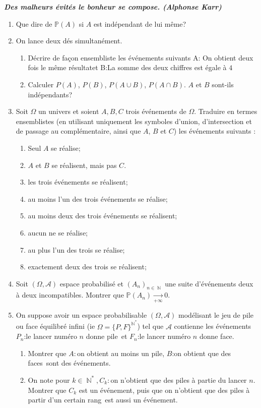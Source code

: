 \documentclass[12pt,a4paper]{article}
\DeclareMathOperator{\N}{\mathbb{N}}
\newcommand{\tribu}{\mathcal{A}}
\renewcommand{\Pr}{\mathbb{P}}
\begin{document}
\emph{\textbf{
Des malheurs évités le bonheur se compose.
(Alphonse Karr)
}}

\begin{enumerate}
\item
Que dire de $\mathbb{P}(A)$ si $A$ est indépendant de lui même?
\item On lance deux d\'es simultan\'ement. 
\begin{enumerate}
\item D\'ecrire 
de fa\c{c}on ensembliste les év\'enements suivants A:\og 
On obtient deux fois le m\^eme r\'esultat\fg et B:\og La 
somme des deux chiffres est \'egale \`a $4$ \fg
\item Calculer $P(A)$, $P(B)$, $P(A\cup B)$, $P(A\cap B)$. 
$A$ et $B$ sont-ils ind\'ependants?
\end{enumerate}

\item
Soit $\Omega$ un univers et soient $A,B,C$ trois événements de $\Omega$. Traduire en termes ensemblistes
(en utilisant uniquement les symboles d'union, d'intersection et de passage au complémentaire, ainsi que $A$, $B$ 
et $C$) les événements suivants :
\begin{enumerate}
	\item
	Seul $A$ se réalise;
	\item $A$ et $B$ se réalisent, mais pas $C$.
	\item  les trois événements se réalisent;
	\item au moins l'un des trois événements se réalise;
	\item au moins deux des trois événements se réalisent;
	\item aucun ne se réalise;
	\item au plus l'un des trois se réalise;
	\item exactement deux des trois se réalisent;

\end{enumerate}

\item

Soit $(\Omega,\tribu)$ espace probabilisé et $(A_n)_{n\in\N}$  une suite d'événements deux à deux incompatibles. Montrer que $\Pr(A_n)\underset{+\infty}{\to}0$.

\item On suppose avoir un espace probabilisable $(\Omega,\tribu)$ modélisant le jeu de pile ou face équilibré infini (ie $\Omega=\{P,F\}^{\N^*}$) tel que $\tribu$ contienne les événements $P_n$:\og le lancer numéro $n$ donne pile\fg \ et $F_n$:\og le lancer numéro $n$ donne face\fg.
\begin{enumerate}
	\item 
	Montrer que $A:$\og on obtient au moins un pile\fg, $B$:\og on obtient que des faces\fg\ sont des événements.
	\item On note pour $k\in \N^*,C_k:$\og on n'obtient que des piles à partie du lancer $n$\fg. Montrer que  $C_k$ est un événement, puis que \og on n'obtient que des piles à partir d'un certain rang\fg \  est aussi un événement.
\end{enumerate}


\end{enumerate}
\end{document}
